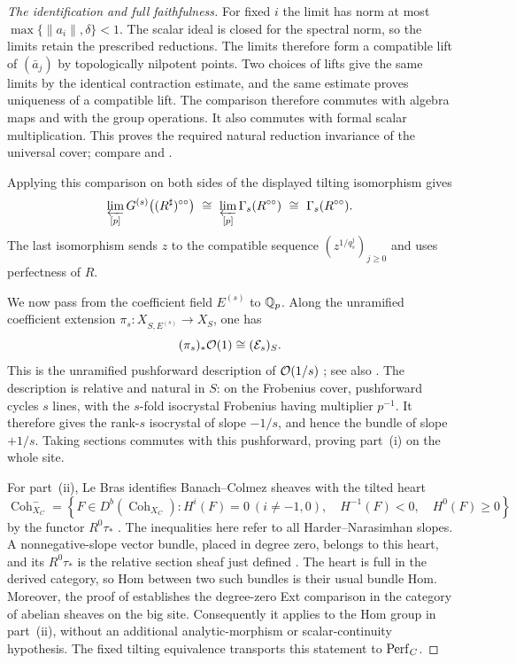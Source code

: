 \begin{proof}[The identification and full faithfulness]
For fixed $i$ the limit has norm at most
$\max\{\|a_i\|,\delta\}<1$.  The scalar ideal is closed for the
spectral norm, so the limits retain the prescribed reductions.
The limits therefore form a compatible
lift of $(\bar a_j)$ by topologically nilpotent points.  Two choices of
lifts give the same limits by the identical contraction estimate, and
the same estimate proves uniqueness of a compatible lift.  The
comparison therefore commutes with algebra maps and with the group
operations.  It also commutes with formal scalar multiplication.
This proves the required natural reduction invariance of the
universal cover; compare \cite[\S\,II.2.1]{FS21} and
\cite[Proposition~2.14, Lemma~2.15, and Remark~2.21]{LeBras18}.

Applying this comparison on both sides of the displayed tilting
isomorphism gives
\[
  \varprojlim_{[p]}
     G^{(s)}\bigl((R^\sharp)^{\circ\circ}\bigr)
  \ \cong\
  \varprojlim_{[p]}\Gamma_s(R^{\circ\circ})
  \ \cong\ \Gamma_s(R^{\circ\circ}).
\]
The last isomorphism sends $z$ to the compatible sequence
$(z^{1/q_s^j})_{j\geq0}$ and uses perfectness of $R$.

We now pass from the coefficient field $E^{(s)}$ to $\mathbb Q_p$.
Along the unramified coefficient extension
$\pi_s:X_{S,E^{(s)}}\to X_S$, one has
\[
  (\pi_s)_*\mathcal O(1)\cong(\mathcal E_s)_S.
\]
This is the unramified pushforward description of
$\mathcal O(1/s)$ \cite[\S\,5.1]{LeBras18}; see also
\cite[proofs of Theorem~II.2.14 and Corollary~II.3.3]{FS21}.
The description is relative and natural
in $S$: on the Frobenius cover, pushforward cycles $s$ lines, with
the $s$-fold isocrystal Frobenius having multiplier $p^{-1}$.
It therefore gives the rank-$s$ isocrystal of slope $-1/s$, and hence
the bundle of slope $+1/s$.  Taking sections commutes with this
pushforward, proving part~\textup{(i)} on the whole site.

For part~\textup{(ii)}, Le Bras identifies Banach--Colmez sheaves with
the tilted heart
\[
  \operatorname{Coh}_{X_C}^{-}
  =\left\{F\in D^b(\operatorname{Coh}_{X_C}):
       H^i(F)=0\ (i\ne-1,0),\quad
       H^{-1}(F)<0,\quad H^0(F)\geq0\right\}
\]
by the functor $R^0\tau_*$
\cite[Theorem~1.2, Theorem~7.1]{LeBras18}.  The inequalities here
refer to all Harder--Narasimhan slopes.  A nonnegative-slope vector
bundle, placed in degree zero, belongs to this heart, and its
$R^0\tau_*$ is the relative section sheaf just defined
\cite[Proposition~6.8 and its proof]{LeBras18}.
The heart is full in the derived category, so Hom between two such
bundles is their usual bundle Hom.  Moreover, the proof of
\cite[Theorem~7.1]{LeBras18} establishes the degree-zero Ext
comparison in the category of abelian sheaves on the big site.
Consequently it applies to the Hom group in part~\textup{(ii)},
without an additional analytic-morphism or scalar-continuity
hypothesis.  The fixed tilting equivalence transports this statement
to $\operatorname{Perf}_C$.
\end{proof}

